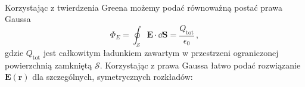 \documentclass[../main.tex]{subfiles}
\begin{document}
\noindent{}\\

Korzystając z twierdzenia Greena możemy podać równoważną postać prawa Gaussa
\begin{equation*}
    \Phi_E=\oint_\mathcal{S}\mathbf{E}\cdot\dd{\mathbf{S}}=\frac{Q_\text{tot}}{\epsilon_0}\,,
\end{equation*}
gdzie \(Q_\text{tot}\) jest całkowitym ładunkiem zawartym w przestrzeni ograniczonej powierzchnią zamkniętą \(\mathcal{S}\). Korzystając z prawa Gaussa łatwo podać rozwiązanie \(\mathbf{E}(\mathbf{r})\) dla szczególnych, symetrycznych rozkładów:
\end{document}
